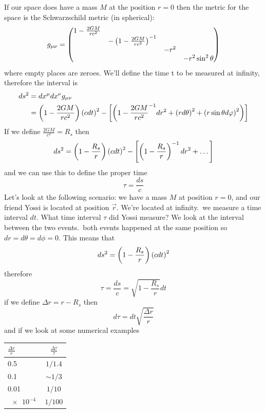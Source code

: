 If our space does have a mass \(M\) at the position \(r=0\) then the metric for the space is the Schwarzschild metric (in spherical):
\begin{equation}
    g_{\mu\nu} = \begin{pmatrix}
        1-\frac{2GM}{rc^2}&&&\\
        &-\left(1-\frac{2GM}{rc^2}\right)^{-1}&&\\
        &&-r^2&\\
        &&&-r^2\sin^2\theta
    \end{pmatrix}
\end{equation}
where empty places are zeroes. We'll define the time t to be measured at infinity, therefore the interval is
\begin{align}
    ds^2 &= dx^\mu dx^\nu g_{\mu\nu}\\
    &= \left(1-\frac{2GM}{rc^2}\right)\left(cdt\right)^2 - \left[\left(1-\frac{2GM}{rc^2}^{-1}dr^2 + \left(rd\theta\right)^2+\left(r\sin\theta d\varphi\right)^2\right)\right]
\end{align}
If we define \(\frac{2GM}{c^2} = R_s\) then
\begin{equation}
    ds^2 = \left(1-\frac{R_s}{r}\right)\left(cdt\right)^2 - \left[\left(1-\frac{R_s}{r}\right)^{-1}dr^2+\dots\right]
\end{equation}
and we can use this to define the proper time
\begin{equation}
    \tau = \frac{ds}{c}
\end{equation}
Let's look at the following scenario: we have a mass \(M\) at position \(r=0\), and our friend Yossi is located at position \(\vec{r}\). We're located at infinity.\ we measure a time interval \(dt\). What time interval \(\tau \) did Yossi measure? We look at the interval between the two events.\ both events happened at the same position so \(dr = d\theta = d\phi = 0\). This means that
\begin{equation}
    ds^2 = \left(1-\frac{R_s}{r}\right)\left(cdt\right)^2
\end{equation}
therefore\begin{equation}
    \tau = \frac{ds}{c} = \sqrt{1-\frac{R_s}{r}}dt
\end{equation}
if we define \(\Delta r = r-R_s\) then
\begin{equation}
    d\tau = dt \sqrt{\frac{\Delta r}{r}}
\end{equation}
and if we look at some numerical examples
\begin{table}[!htb]
    \centering
    \begin{tabular}{l|c}
        \(\frac{\Delta r}{r}\) & \(\frac{\Delta \tau}{\tau}\) \\
        \hline
        0.5 & \(1/1.4\) \\
        0.1 & \(\sim 1/3\) \\
        0.01 & \(1/10\) \\
        \(\qty{e-4}{}\) & \(1/100\) 
    \end{tabular}
\end{table}

